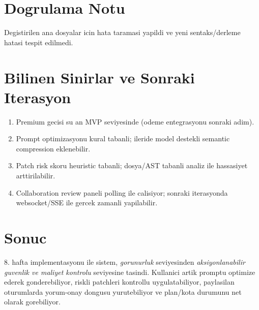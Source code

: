 \documentclass[12pt,a4paper]{article}
\begin{document}
\section{Dogrulama Notu}
Degistirilen ana dosyalar icin hata taramasi yapildi ve yeni sentaks/derleme hatasi tespit edilmedi.

\section{Bilinen Sinirlar ve Sonraki Iterasyon}
\begin{enumerate}[leftmargin=*]
  \item Premium gecisi su an MVP seviyesinde (odeme entegrasyonu sonraki adim).
  \item Prompt optimizasyonu kural tabanli; ileride model destekli semantic compression eklenebilir.
  \item Patch risk skoru heuristic tabanli; dosya/AST tabanli analiz ile hassasiyet arttirilabilir.
  \item Collaboration review paneli polling ile calisiyor; sonraki iterasyonda websocket/SSE ile gercek zamanli yapilabilir.
\end{enumerate}

\section{Sonuc}
8. hafta implementasyonu ile sistem, \textit{gorunurluk} seviyesinden \textit{aksiyonlanabilir guvenlik ve maliyet kontrolu} seviyesine tasindi.
Kullanici artik promptu optimize ederek gonderebiliyor, riskli patchleri kontrollu uygulatabiliyor,
paylasilan oturumlarda yorum-onay dongusu yurutebiliyor ve plan/kota durumunu net olarak gorebiliyor.
\end{document}
